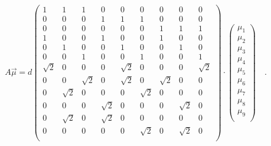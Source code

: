 \begin{equation}
    A \vec \mu = d 
    \begin{pmatrix} 
        1       & 1        & 1      & 0         & 0         & 0         & 0         & 0         & 0         \\
        0       & 0        & 0      & 1         & 1         & 1         & 0         & 0         & 0         \\
        0       & 0        & 0      & 0         & 0         & 0         & 1         & 1         & 1         \\
        1       & 0        & 0      & 1         & 0         & 0         & 1         & 0         & 0         \\
        0       & 1        & 0      & 0         & 1         & 0         & 0         & 1         & 0         \\
        0       & 0        & 1      & 0         & 0         & 1         & 0         & 0         & 1         \\
        \sqrt{2}& 0        & 0      & 0         & \sqrt{2}  & 0         & 0         & 0         & \sqrt{2}  \\
        0       & 0        &\sqrt{2}& 0         &\sqrt{2}   & 0         &\sqrt{2}   & 0         & 0         \\
        0       & \sqrt{2} & 0      & 0         & 0         & \sqrt{2}  & 0         & 0         & 0         \\
        0       & 0        & 0      & \sqrt{2}  & 0         & 0         & 0         & \sqrt{2}  & 0         \\
        0       & \sqrt{2} & 0      & \sqrt{2}  & 0         & 0         & 0         & 0         & 0         \\
        0       & 0        & 0      & 0         & 0         &\sqrt{2}   & 0         & \sqrt{2}  & 0         \\
    \end{pmatrix} \cdot
    \begin{pmatrix} 
        \mu_1  \\
        \mu_2  \\
        \mu_3  \\
        \mu_4  \\
        \mu_5  \\
        \mu_6  \\
        \mu_7  \\
        \mu_8  \\
        \mu_9  \\
    \end{pmatrix} \quad.
    \label{eqn:A}
\end{equation}


